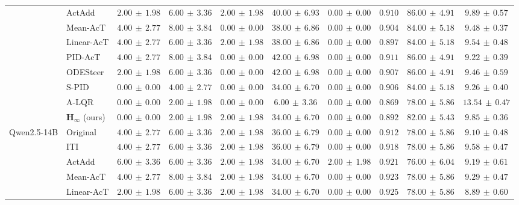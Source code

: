 \begin{table}[!htbp]
{\begin{tabular}{llccccc|ccc}
 & ActAdd & $2.00\,\pm\,1.98$ & $6.00\,\pm\,3.36$ & $2.00\,\pm\,1.98$ & $40.00\,\pm\,6.93$ & $0.00\,\pm\,0.00$ & $0.910$ & $86.00\,\pm\,4.91$ & $9.89\,\pm\,0.57$\\
 & Mean-AcT & $4.00\,\pm\,2.77$ & $8.00\,\pm\,3.84$ & $0.00\,\pm\,0.00$ & $38.00\,\pm\,6.86$ & $0.00\,\pm\,0.00$ & $0.904$ & $84.00\,\pm\,5.18$ & $9.48\,\pm\,0.37$\\
 & Linear-AcT & $4.00\,\pm\,2.77$ & $6.00\,\pm\,3.36$ & $2.00\,\pm\,1.98$ & $38.00\,\pm\,6.86$ & $0.00\,\pm\,0.00$ & $0.897$ & $84.00\,\pm\,5.18$ & $9.54\,\pm\,0.48$\\
 & PID-AcT & $4.00\,\pm\,2.77$ & $8.00\,\pm\,3.84$ & $0.00\,\pm\,0.00$ & $42.00\,\pm\,6.98$ & $0.00\,\pm\,0.00$ & $0.911$ & $86.00\,\pm\,4.91$ & $9.22\,\pm\,0.39$\\
 & ODESteer & $2.00\,\pm\,1.98$ & $6.00\,\pm\,3.36$ & $0.00\,\pm\,0.00$ & $42.00\,\pm\,6.98$ & $0.00\,\pm\,0.00$ & $0.907$ & $86.00\,\pm\,4.91$ & $9.46\,\pm\,0.59$\\
 & S-PID & $0.00\,\pm\,0.00$ & $4.00\,\pm\,2.77$ & $0.00\,\pm\,0.00$ & $34.00\,\pm\,6.70$ & $0.00\,\pm\,0.00$ & $0.906$ & $84.00\,\pm\,5.18$ & $9.26\,\pm\,0.40$\\
 & A-LQR & $0.00\,\pm\,0.00$ & $2.00\,\pm\,1.98$ & $0.00\,\pm\,0.00$ & $6.00\,\pm\,3.36$ & $0.00\,\pm\,0.00$ & $0.869$ & $78.00\,\pm\,5.86$ & $13.54\,\pm\,0.47$\\
 & $\boldsymbol{H_\infty}$ (ours) & $0.00\,\pm\,0.00$ & $2.00\,\pm\,1.98$ & $2.00\,\pm\,1.98$ & $34.00\,\pm\,6.70$ & $0.00\,\pm\,0.00$ & $0.892$ & $82.00\,\pm\,5.43$ & $9.85\,\pm\,0.36$\\
\midrule
\multirow{10}{*}{Qwen2.5-14B} & Original & $4.00\,\pm\,2.77$ & $6.00\,\pm\,3.36$ & $2.00\,\pm\,1.98$ & $36.00\,\pm\,6.79$ & $0.00\,\pm\,0.00$ & $0.912$ & $78.00\,\pm\,5.86$ & $9.10\,\pm\,0.48$\\
 & ITI & $4.00\,\pm\,2.77$ & $6.00\,\pm\,3.36$ & $2.00\,\pm\,1.98$ & $36.00\,\pm\,6.79$ & $0.00\,\pm\,0.00$ & $0.918$ & $78.00\,\pm\,5.86$ & $9.58\,\pm\,0.47$\\
 & ActAdd & $6.00\,\pm\,3.36$ & $6.00\,\pm\,3.36$ & $2.00\,\pm\,1.98$ & $34.00\,\pm\,6.70$ & $2.00\,\pm\,1.98$ & $0.921$ & $76.00\,\pm\,6.04$ & $9.19\,\pm\,0.61$\\
 & Mean-AcT & $4.00\,\pm\,2.77$ & $8.00\,\pm\,3.84$ & $2.00\,\pm\,1.98$ & $34.00\,\pm\,6.70$ & $0.00\,\pm\,0.00$ & $0.923$ & $78.00\,\pm\,5.86$ & $9.29\,\pm\,0.47$\\
 & Linear-AcT & $2.00\,\pm\,1.98$ & $6.00\,\pm\,3.36$ & $2.00\,\pm\,1.98$ & $34.00\,\pm\,6.70$ & $0.00\,\pm\,0.00$ & $0.925$ & $78.00\,\pm\,5.86$ & $8.89\,\pm\,0.60$\\

\end{tabular}}
\end{table}
